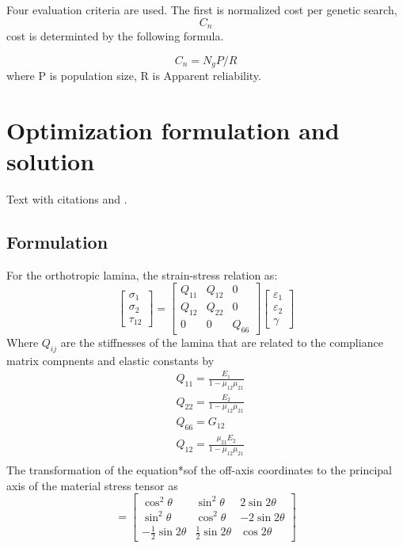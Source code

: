 \documentclass[smallextended]{svjour3}       %
\begin{document}
Four evaluation criteria are used. 
The first is normalized cost per genetic search, $$C_{n}$$
cost is determinted by the following formula.

$$C_{n} = N_{g}P/R$$
where P is population size, R is Apparent reliability.




\section{Optimization formulation and solution}\label{sec:1}
Text with citations \cite{RefB} and \cite{RefJ}.
\subsection{Formulation}
For the orthotropic lamina, the strain-stress relation as:
\begin{equation}
    \begin{bmatrix}
        \sigma_1\\
        \sigma_2\\
        \tau_{12}
    \end{bmatrix}
    =
    \begin{bmatrix}
        Q_{11} & Q_{12} & 0\\
        Q_{12} & Q_{22} & 0\\
        0 & 0 & Q_{66}
    \end{bmatrix}
    \begin{bmatrix}
        \varepsilon_1\\
        \varepsilon_2\\
        \gamma
    \end{bmatrix}
\end{equation}
Where $Q_{ij}$ are the stiffnesses of the lamina that are related to the compliance matrix
compnents and elastic constants by
\begin{equation}
    \begin{split}
    &Q_{11}=\frac{E_1}{1-\mu_{12}\mu_{21}}\\
    &Q_{22}=\frac{E_2}{1-\mu_{12}\mu_{21}}\\
    &Q_{66}=G_{12}\\
    &Q_{12}=\frac{\mu_{21}E_2}{1-\mu_{12}\mu_{21}}\\
    \end{split}
\end{equation}
The transformation of the equation*sof the off-axis coordinates to the principal axis of the material stress tensor as
\begin{equation}
    [T]=
    \begin{bmatrix}
        \cos^2\theta & \sin^2\theta & 2\sin2\theta \\
        \sin^2\theta & \cos^2\theta & -2\sin2\theta \\
        -\frac{1}{2}\sin2\theta & \frac{1}{2}\sin2\theta & \cos2\theta
    \end{bmatrix}
\end{equation}
\end{document}
